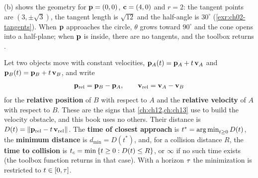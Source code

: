 (b) shows the geometry for $\mathbf{p}=(0,0)$, $\mathbf{c}=(4,0)$ and $r=2$: the tangent points are $(3,\pm\sqrt3)$, the tangent length is $\sqrt{12}$ and the half-angle is $30^\circ$ (\cref{exr:ch02-tangents}). When $\mathbf{p}$ approaches the circle, $\theta$ grows toward $90^\circ$ and the cone opens into a half-plane; when $\mathbf{p}$ is inside, there are no tangents, and the toolbox returns .

\begin{definition}
\label{def:ch02-closest-approach}
Let two objects move with constant velocities, $\mathbf{p}_A(t)=\mathbf{p}_A+t\,\mathbf{v}_A$ and $\mathbf{p}_B(t)=\mathbf{p}_B+t\,\mathbf{v}_B$, and write
\begin{equation}
\mathbf{p}_{\mathrm{rel}}=\mathbf{p}_B-\mathbf{p}_A,\qquad \mathbf{v}_{\mathrm{rel}}=\mathbf{v}_A-\mathbf{v}_B
\label{eq:ch02-relative}
\end{equation}
for the \textbf{relative position} of $B$ with respect to $A$ and the \textbf{relative velocity} of $A$ with respect to $B$. These are the signs that \cref{ch:ch12,ch:ch13} use to build the velocity obstacle, and this book uses no others. Their distance is $D(t)=\left\lVert \mathbf{p}_{\mathrm{rel}}-t\,\mathbf{v}_{\mathrm{rel}} \right\rVert$. The \textbf{time of closest approach} is $t^*=\operatorname*{arg\,min}_{t\ge0}D(t)$, the \textbf{minimum distance} is $d_{\min}=D(t^*)$, and, for a collision distance $R$, the \textbf{time to collision} is $t_c=\min\left\{ t\ge0 : D(t)\le R \right\}$, or $\infty$ if no such time exists (the toolbox function  returns  in that case). With a horizon $\tau$ the minimization is restricted to $t\in[0,\tau]$.
\end{definition}

